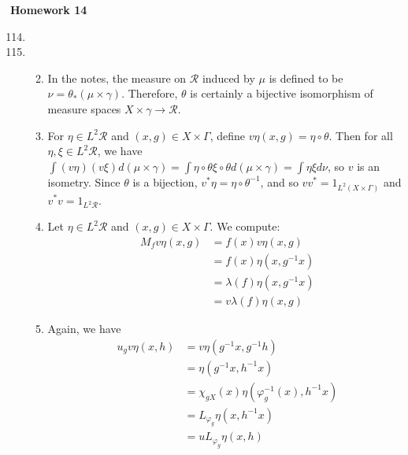 \documentclass[a4paper,10pt]{report}
\begin{document}

\pagestyle{fancy}	
\fancyhf{} %
\setlength{\headheight}{60pt}

\begin{center}
	\textbf{Homework 14}
\end{center}
\begin{enumerate}
		\setcounter{enumi}{113}
	\item 
	\item 
		\begin{enumerate}
				\setcounter{enumi}{1}
			\item In the notes, the measure on $\mathcal{R}$ induced by $\mu$ is defined to be $\nu=\theta_*(\mu\times\gamma)$. Therefore, $\theta$ is certainly a bijective isomorphism of measure spaces $X\times\gamma\to\mathcal{R}$. 
				\setcounter{enumi}{0}
			\item For $\eta\in L^2\mathcal{R}$ and $(x,g)\in X\times\Gamma$, define $v\eta(x,g)=\eta\circ\theta$. Then for all $\eta,\xi\in L^2\mathcal{R}$, we have $\int(v\eta)(v\xi)d(\mu\times\gamma)=\int\eta\circ\theta\xi\circ\theta d(\mu\times\gamma)=\int\eta\xi d\nu$, so $v$ is an isometry. Since $\theta$ is a bijection, $v^*\eta=\eta\circ\theta^{-1}$, and so $vv^*=1_{L^2(X\times\Gamma)}$ and $v^*v=1_{L^2\mathcal{R}}$. 
				\setcounter{enumi}{2}
			\item Let $\eta\in L^2\mathcal{R}$ and $(x,g)\in X\times\Gamma$. We compute:
				\begin{align*}
					M_fv\eta(x,g) &= f(x)v\eta(x,g)\\
					&= f(x)\eta(x,g^{-1}x)\\
					&= \lambda(f)\eta(x,g^{-1}x)\\
					&= v\lambda(f)\eta(x,g)
				\end{align*}
			\item Again, we have 
				\begin{align*}
					u_gv\eta(x,h) &= v\eta(g^{-1}x,g^{-1}h)\\
					&= \eta(g^{-1}x,h^{-1}x)\\
					&= \chi_{gX}(x)\eta(\varphi_g^{-1}(x),h^{-1}x)\\
					&= L_{\varphi_g}\eta(x,h^{-1}x)\\
					&= uL_{\varphi_g}\eta(x,h)

\end{align*}
\end{enumerate}
\end{enumerate}
\end{document}
